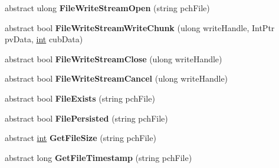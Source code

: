 \begin{DoxyCompactItemize}
\item 
\hypertarget{classValve_1_1Steamworks_1_1ISteamRemoteStorage_ab1df38082e3d0d76d6e2df1d372e4d2c}{}abstract ulong {\bfseries File\+Write\+Stream\+Open} (string pch\+File)\label{classValve_1_1Steamworks_1_1ISteamRemoteStorage_ab1df38082e3d0d76d6e2df1d372e4d2c}

\item 
\hypertarget{classValve_1_1Steamworks_1_1ISteamRemoteStorage_a5bb3b5a1375508660b3e534fc6759dde}{}abstract bool {\bfseries File\+Write\+Stream\+Write\+Chunk} (ulong write\+Handle, Int\+Ptr pv\+Data, \hyperlink{SDL__thread_8h_a6a64f9be4433e4de6e2f2f548cf3c08e}{int} cub\+Data)\label{classValve_1_1Steamworks_1_1ISteamRemoteStorage_a5bb3b5a1375508660b3e534fc6759dde}

\item 
\hypertarget{classValve_1_1Steamworks_1_1ISteamRemoteStorage_a238280d1cf6e8873969744cce95690b6}{}abstract bool {\bfseries File\+Write\+Stream\+Close} (ulong write\+Handle)\label{classValve_1_1Steamworks_1_1ISteamRemoteStorage_a238280d1cf6e8873969744cce95690b6}

\item 
\hypertarget{classValve_1_1Steamworks_1_1ISteamRemoteStorage_a510f61abfdf072eeee35e61acf602e32}{}abstract bool {\bfseries File\+Write\+Stream\+Cancel} (ulong write\+Handle)\label{classValve_1_1Steamworks_1_1ISteamRemoteStorage_a510f61abfdf072eeee35e61acf602e32}

\item 
\hypertarget{classValve_1_1Steamworks_1_1ISteamRemoteStorage_ad8a7e6cf7191644d01114519a11cf776}{}abstract bool {\bfseries File\+Exists} (string pch\+File)\label{classValve_1_1Steamworks_1_1ISteamRemoteStorage_ad8a7e6cf7191644d01114519a11cf776}

\item 
\hypertarget{classValve_1_1Steamworks_1_1ISteamRemoteStorage_a5bf566aa6de45bc2169702fea3beb7af}{}abstract bool {\bfseries File\+Persisted} (string pch\+File)\label{classValve_1_1Steamworks_1_1ISteamRemoteStorage_a5bf566aa6de45bc2169702fea3beb7af}

\item 
\hypertarget{classValve_1_1Steamworks_1_1ISteamRemoteStorage_a4c592cddfca279b060e5029f16f50ff3}{}abstract \hyperlink{SDL__thread_8h_a6a64f9be4433e4de6e2f2f548cf3c08e}{int} {\bfseries Get\+File\+Size} (string pch\+File)\label{classValve_1_1Steamworks_1_1ISteamRemoteStorage_a4c592cddfca279b060e5029f16f50ff3}

\item 
\hypertarget{classValve_1_1Steamworks_1_1ISteamRemoteStorage_a416cc166148a563e4d05e9f1beddd6c8}{}abstract long {\bfseries Get\+File\+Timestamp} (string pch\+File)\label{classValve_1_1Steamworks_1_1ISteamRemoteStorage_a416cc166148a563e4d05e9f1beddd6c8}


\end{DoxyCompactItemize}
